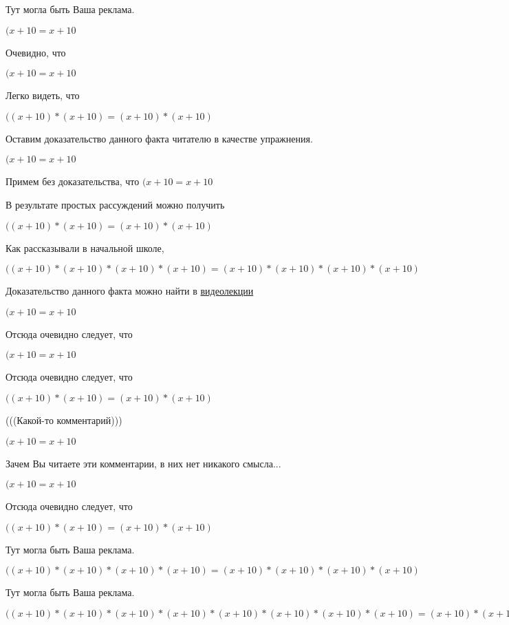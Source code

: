 \documentclass[12pt,a4paper,fleqn]{article}
\theoremstyle{definition}
\begin{document}
Тут могла быть Ваша реклама.

$( x  +  10  =  x  +  10 $

Очевидно, что

$( x  +  10  =  x  +  10 $

Легко видеть, что

$(( x  +  10 ) * ( x  +  10 ) = ( x  +  10 ) * ( x  +  10 )$

Оставим доказательство данного факта читателю в качестве упражнения.

$( x  +  10  =  x  +  10 $

Примем без доказательства, что
$( x  +  10  =  x  +  10 $

В результате простых рассуждений можно получить

$(( x  +  10 ) * ( x  +  10 ) = ( x  +  10 ) * ( x  +  10 )$

Как рассказывали в начальной школе,

$(( x  +  10 ) * ( x  +  10 ) * ( x  +  10 ) * ( x  +  10 ) = ( x  +  10 ) * ( x  +  10 ) * ( x  +  10 ) * ( x  +  10 )$

Доказательство данного факта можно найти в \href{https://www.youtube.com/watch?v=dQw4w9WgXcQ}{видеолекции}

$( x  +  10  =  x  +  10 $

Отсюда очевидно следует, что

$( x  +  10  =  x  +  10 $

Отсюда очевидно следует, что

$(( x  +  10 ) * ( x  +  10 ) = ( x  +  10 ) * ( x  +  10 )$

(((Какой-то комментарий)))

$( x  +  10  =  x  +  10 $

Зачем Вы читаете эти комментарии, в них нет никакого смысла...

$( x  +  10  =  x  +  10 $

Отсюда очевидно следует, что

$(( x  +  10 ) * ( x  +  10 ) = ( x  +  10 ) * ( x  +  10 )$

Тут могла быть Ваша реклама.

$(( x  +  10 ) * ( x  +  10 ) * ( x  +  10 ) * ( x  +  10 ) = ( x  +  10 ) * ( x  +  10 ) * ( x  +  10 ) * ( x  +  10 )$

Тут могла быть Ваша реклама.

$(( x  +  10 ) * ( x  +  10 ) * ( x  +  10 ) * ( x  +  10 ) * ( x  +  10 ) * ( x  +  10 ) * ( x  +  10 ) * ( x  +  10 ) = ( x  +  10 ) * ( x  +  10 ) * ( x  +  10 ) * ( x  +  10 ) * ( x  +  10 ) * ( x  +  10 ) * ( x  +  10 ) * ( x  +  10 )$
\end{document}
